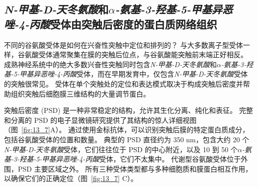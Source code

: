 \subsection{\textit{N-甲基-D-天冬氨酸}和\textit{$\alpha$-氨基-3-羟基-5-甲基异恶唑-4-丙酸}受体由突触后密度的蛋白质网络组织}

不同的谷氨酸受体是如何在兴奋性突触中定位和排列的？ 
与大多数离子型受体一样，谷氨酸受体通常聚集在膜的突触后位点，与谷氨酸能突触前末端正好相反。
成熟神经系统中的绝大多数兴奋性突触同时包含\textit{N-甲基-D-天冬氨酸}和\textit{$\alpha$-氨基-3-羟基-5-甲基异恶唑-4-丙酸}受体，而在早期发育中，仅包含\textit{N-甲基-D-天冬氨酸}受体的突触很常见。
受体在单个突触处的定位和表达模式取决于构成突触后密度并帮助组织突触后细胞膜三维结构的大量调节蛋白。


突触后密度 (PSD) 是一种非常稳定的结构，允许其生化分离、纯化和表征。
完整和分离的 PSD 的电子显微镜研究提供了其结构的惊人详细视图（图~\ref{fig:13_7}A）。 
通过使用金标抗体，可以识别突触后膜的特定蛋白质成分，包括谷氨酸受体的位置和数量。
典型的 PSD 直径约为 350 nm，包含大约 20 个\textit{N-甲基-D-天冬氨酸}受体，它们往往位于 PSD 的中心附近，以及 10 到 50 个\textit{$\alpha$-氨基-3-羟基-5-甲基异恶唑-4-丙酸}受体，它们不太集中。
代谢型谷氨酸受体位于外围，PSD 主要区域之外。
所有三种受体类型都与多种细胞质和膜蛋白相互作用，以确保它们的正确定位（图~\ref{fig:13_7} C）。


